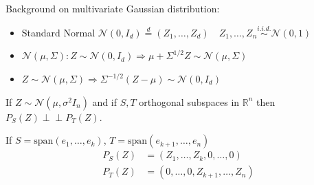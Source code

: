 Background on multivariate Gaussian distribution:
\begin{itemize}
    \item Standard Normal $\mathcal{N}(0, I_d) \overset{d}{=} (Z_1, \dots, Z_d) \quad Z_1, \dots, Z_n \overset{i.i.d.}{\sim} \mathcal{N}(0,1)$
    \item $\mathcal{N}(\mu, \Sigma) : Z \sim \mathcal{N}(0, I_d) \Rightarrow \mu + \Sigma^{1/2} Z \sim \mathcal{N}(\mu, \Sigma)$
    \item $Z \sim \mathcal{N}(\mu, \Sigma) \Rightarrow \Sigma^{-1/2}(Z - \mu) \sim \mathcal{N}(0, I_d)$
\end{itemize}

\begin{proposition}
If $Z \sim \mathcal{N}(\mu, \sigma^2 I_n)$ and if $S, T$ orthogonal subspaces in $\mathbb{R}^n$ then $P_S(Z) \perp \!\! \perp P_T(Z)$.    
\end{proposition}


\begin{example}
    If $S = \text{span}(e_1, \dots, e_k)$, $T = \text{span}(e_{k+1}, \dots, e_n)$
    \begin{align*}
        P_S(Z) &= (Z_1, \dots, Z_k, 0, \dots, 0) \\
        P_T(Z) &= (0, \dots, 0, Z_{k+1}, \dots, Z_n)
    \end{align*}
\end{example}